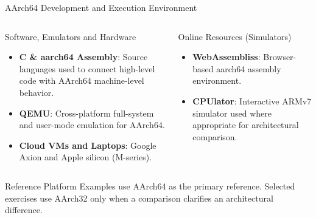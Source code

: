 \documentclass[aspectratio=169,11pt,t]{beamer}
\newcommand{\key}[1]{\textbf{#1}}
\begin{document}
\begin{frame}{AArch64 Development and Execution Environment}

\vspace{-0.25cm}

\begin{columns}[T,onlytextwidth]


\begin{block}{Software, Emulators and Hardware}
\begin{itemize}
  \item \key{C \& aarch64 Assembly}:
        Source languages used to connect high-level code
        with AArch64 machine-level behavior.

  \item \key{QEMU}:
        Cross-platform full-system and user-mode emulation
        for AArch64.

  \item \key{Cloud VMs and Laptops}:
        Google Axion and Apple silicon (M-series).
\end{itemize}
\end{block}


\begin{block}{Online Resources (Simulators)}
\begin{itemize}
  \item \key{WebAssembliss}:
        Browser-based aarch64 assembly environment.

  \item \key{CPUlator}:
        Interactive ARMv7 simulator used where appropriate
        for architectural comparison.
\end{itemize}
\end{block}

\end{columns}

\begin{block}{Reference Platform}
Examples use AArch64 as the primary reference.
Selected exercises use AArch32 only when a comparison
clarifies an architectural difference.
\end{block}

\end{frame}



\end{document}
